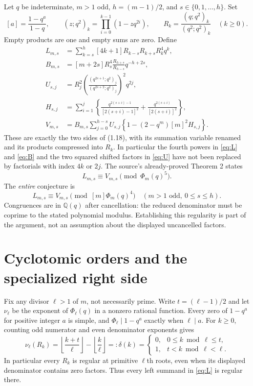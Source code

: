 \documentclass[11pt,a4paper]{article}
\newcommand{\ph}{\Phi}\newcommand{\ord}{\operatorname{ord}}
\begin{document}
Let $q$ be indeterminate, $m>1$ odd, $h=(m-1)/2$, and
$s\in\{0,1,\ldots,h\}$. Set
\[
 [a]=\frac{1-q^a}{1-q},\qquad
 (z;q^2)_k=\prod_{i=0}^{k-1}(1-zq^{2i}),\qquad
 R_k=\frac{(q;q^2)_k}{(q^2;q^2)_k}\quad(k\geq0).
\]
Empty products are one and empty sums are zero. Define
\begin{align}
 L_{m,s}&=\sum_{k=s}^{h}[4k+1]R_{k-s}R_{k+s}R_k^4q^k,\label{eq:L}\\
 B_{m,s}&=[m+2s]R_s^4\frac{R_{h+s}}{R_{h-s}}q^{-h+2s},\label{eq:B}\\
 U_{s,j}&=R_j^2
 \left(\frac{(q^{2s+1};q^2)_j}{(q^{2s+2};q^2)_j}\right)^2q^{2j},\label{eq:U}\\
 H_{s,j}&=\sum_{i=1}^j\left\{
 \frac{q^{2(s+i)-1}}{[2(s+i)-1]^2}
 +\frac{q^{2(s+i)}}{[2(s+i)]^2}\right\},\label{eq:H}\\
 V_{m,s}&=B_{m,s}\sum_{j=0}^{h-s}U_{s,j}
 \left\{1-(2-q^m)[m]^2H_{s,j}\right\}.\label{eq:V}
\end{align}
These are exactly the two sides of (1.18), with its summation variable
renamed and its products compressed into $R_k$. In particular the fourth
powers in \eqref{eq:L} and \eqref{eq:B} and the two squared shifted factors
in \eqref{eq:U} have not been replaced by factorials with index $4k$ or $2j$.
The source's already-proved Theorem 2 states
\begin{equation}
 L_{m,s}\equiv V_{m,s}\pmod{\ph_m(q)^5}.\label{eq:known}
\end{equation}
The \emph{entire} conjecture is
\begin{equation}
 L_{m,s}\equiv V_{m,s}\pmod{[m]\ph_m(q)^4}
 \quad(m>1\text{ odd},\ 0\leq s\leq h).\label{eq:target}
\end{equation}
Congruences are in $\mathbb Q(q)$ after cancellation: the reduced denominator
must be coprime to the stated polynomial modulus. Establishing this
regularity is part of the argument, not an assumption about the displayed
uncancelled factors.

\section{Cyclotomic orders and the specialized right side}
Fix any divisor $\ell>1$ of $m$, not necessarily prime. Write
$t=(\ell-1)/2$ and let $\nu_\ell$ be the exponent of $\ph_\ell(q)$ in
a nonzero rational function. Every zero of $1-q^a$ for positive integer
$a$ is simple, and $\ph_\ell\mid1-q^a$ exactly when $\ell\mid a$.
For $k\geq0$, counting odd numerator and even denominator exponents gives
\begin{equation}
 \nu_\ell(R_k)=\left\lfloor\frac{k+t}{\ell}\right\rfloor
 -\left\lfloor\frac{k}{\ell}\right\rfloor
 =:\delta(k)
 =\begin{cases}0,&0\leq k\bmod\ell\leq t,\\1,&t<k\bmod\ell<\ell.
 \end{cases}\label{eq:delta}
\end{equation}
In particular every $R_k$ is regular at primitive $\ell$th roots, even
when its displayed denominator contains zero factors. Thus every left
summand in \eqref{eq:L} is regular there.
\end{document}
